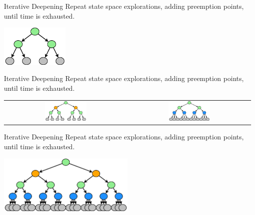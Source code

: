 \documentclass[xcolor=dvipsnames]{beamer}
\begin{document}
\begin{frame}{Iterative Deepening}
	Repeat state space explorations, adding preemption points, until time is exhausted.
	\vspace{0.29in}
	\begin{center}
		\includegraphics[width=0.25\textwidth]{tree0.pdf}
	\end{center}
\end{frame}

\begin{frame}{Iterative Deepening}
	Repeat state space explorations, adding preemption points, until time is exhausted.
	\vspace{0.15in}
	\begin{center}
		\begin{tabular}{cc}
			\includegraphics[width=0.35\textwidth]{tree1.pdf} &
			\includegraphics[width=0.35\textwidth]{tree2.pdf}
		\end{tabular}
	\end{center}
\end{frame}


\begin{frame}{Iterative Deepening}
	Repeat state space explorations, adding preemption points, until time is exhausted.
	\begin{center}
		\includegraphics[width=0.5\textwidth]{tree3.pdf}
	\end{center}
\end{frame}
\end{document}
